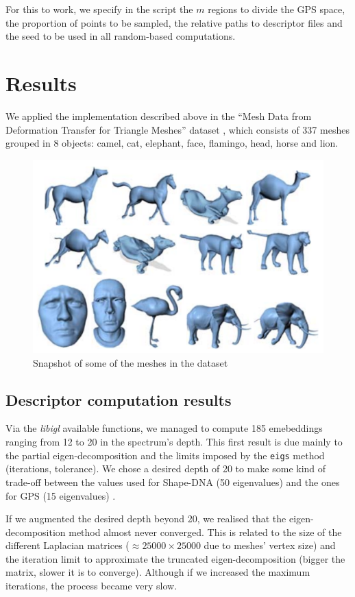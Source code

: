 \documentclass[conference]{IEEEtran}
\newcommand{\q}[1]{``#1''} %
\begin{document}
For this to work, we specify in the script the $m$ regions to divide the GPS space, the proportion of points to be sampled, the relative paths to descriptor files and the seed to be used in all random-based computations.

\section{Results}

We applied the implementation described above in the \q{Mesh Data from Deformation Transfer for Triangle Meshes} dataset \cite{dataset}, which consists of 337 meshes grouped in 8 objects: \textsf{camel, cat, elephant, face, flamingo, head, horse} and \textsf{lion}.

\begin{figure}[H]
    \centering
    \includegraphics[width=0.7\columnwidth]{dataset_snapshot.png}
    \caption{Snapshot of some of the meshes in the dataset}
    \label{fig:dataset_snap}
\end{figure}

\subsection{Descriptor computation results}

Via the \emph{libigl} available functions, we managed to compute 185 emebeddings ranging from 12 to 20 in the spectrum's depth. This first result is due mainly to the partial eigen-decomposition and the limits imposed by the \texttt{eigs} method (iterations, tolerance). We chose a desired depth of 20 to make some kind of trade-off between the values used for Shape-DNA (50 eigenvalues) \cite{Reuter06} and the ones for GPS (15 eigenvalues) \cite{Rustamov07}.

If we augmented the desired depth beyond 20, we realised that the eigen-decomposition method almost never converged. This is related to the size of the different Laplacian matrices ($\approx 25000 \times 25000$ due to meshes' vertex size) and the iteration limit to approximate the truncated eigen-decomposition (bigger the matrix, slower it is to converge). Although if we increased the maximum iterations, the process became very slow.
\end{document}
